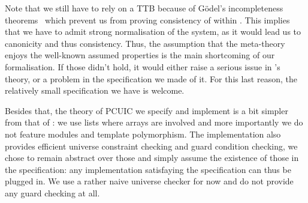 Note that we still have to rely on a \acrshort{TTB} because of Gödel's
incompleteness theorems~\misref{} which prevent us from proving consistency of
\Coq within \Coq.
This implies that we have to admit strong normalisation of the system, as it
would lead us to canonicity and thus consistency.
Thus, the assumption that the meta-theory enjoys the well-known assumed
properties is the main shortcoming of our formalisation. If those didn't hold,
it would either raise a serious issue in \Coq's theory, or a problem in the
specification we made of it. For this last reason, the relatively small
specification we have is welcome.

Besides that, the theory of \acrshort{PCUIC} we specify and implement is a bit
simpler from that of \Coq: we use lists where arrays are involved and more
importantly we do not feature modules and template polymorphism.
The implementation also provides efficient universe constraint checking and
guard condition checking, we chose to remain abstract over those and simply
assume the existence of those in the specification: any implementation
satisfaying the specification can thus be plugged in. We use a rather naive
universe checker for now and do not provide any guard checking at all.